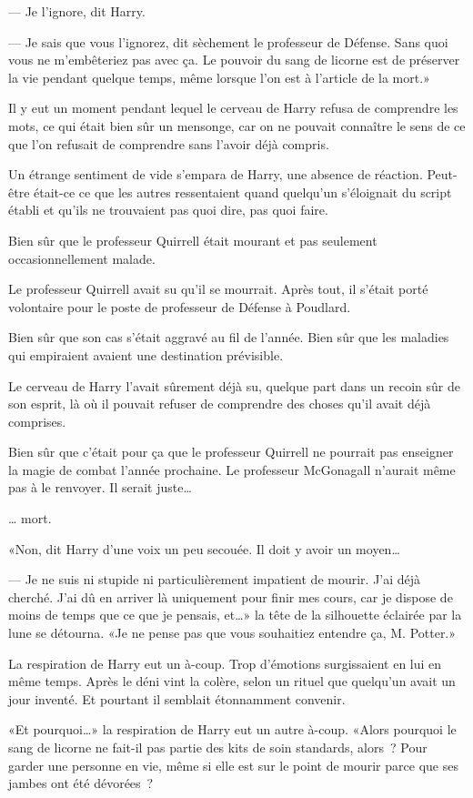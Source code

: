 --- Je l'ignore, dit Harry.

--- Je sais que vous l'ignorez, dit sèchement le professeur de Défense. Sans quoi vous ne m'embêteriez pas avec ça. Le pouvoir du sang de licorne est de préserver la vie pendant quelque temps, même lorsque l'on est à l'article de la mort.»

Il y eut un moment pendant lequel le cerveau de Harry refusa de comprendre les mots, ce qui était bien sûr un mensonge, car on ne pouvait connaître le sens de ce que l'on refusait de comprendre sans l'avoir déjà compris.

Un étrange sentiment de vide s'empara de Harry, une absence de réaction. Peut-être était-ce ce que les autres ressentaient quand quelqu'un s'éloignait du script établi et qu'ils ne trouvaient pas quoi dire, pas quoi faire.

Bien sûr que le professeur Quirrell était mourant et pas seulement occasionnellement malade.

Le professeur Quirrell avait su qu'il se mourrait. Après tout, il s'était porté volontaire pour le poste de professeur de Défense à Poudlard.

Bien sûr que son cas s'était aggravé au fil de l'année. Bien sûr que les maladies qui empiraient avaient une destination prévisible.

Le cerveau de Harry l'avait sûrement déjà su, quelque part dans un recoin sûr de son esprit, là où il pouvait refuser de comprendre des choses qu'il avait déjà comprises.

Bien sûr que c'était pour ça que le professeur Quirrell ne pourrait pas enseigner la magie de combat l'année prochaine. Le professeur McGonagall n'aurait même pas à le renvoyer. Il serait juste…

… mort.

«Non, dit Harry d'une voix un peu secouée. Il doit y avoir un moyen…

--- Je ne suis ni stupide ni particulièrement impatient de mourir. J'ai déjà cherché. J'ai dû en arriver là uniquement pour finir mes cours, car je dispose de moins de temps que ce que je pensais, et…» la tête de la silhouette éclairée par la lune se détourna. «Je ne pense pas que vous souhaitiez entendre ça, M. Potter.»

La respiration de Harry eut un à-coup. Trop d'émotions surgissaient en lui en même temps. Après le déni vint la colère, selon un rituel que quelqu'un avait un jour inventé. Et pourtant il semblait étonnamment convenir.

«Et pourquoi…» la respiration de Harry eut un autre à-coup. «Alors pourquoi le sang de licorne ne fait-il pas partie des kits de soin standards, alors~? Pour garder une personne en vie, même si elle est sur le point de mourir parce que ses jambes ont été dévorées~?

